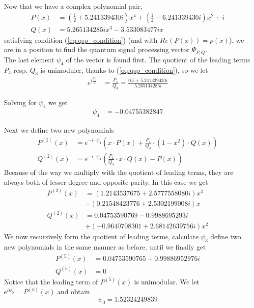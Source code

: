 \documentclass{article}
\begin{document}
\noindent Now that we have a complex polynomial pair, 
\begin{align*}
    P(x) & = \left( \frac{1}{2} + 5.241339430 i \right) x^4 + \left( \frac{1}{2} - 6.241339430 i \right) x^2 + i \\
    Q(x) & = 5.265134285 i x^3 - 3.533083477 i x
\end{align*}
satisfying condition (\ref{eq:qsp_condition}) (and with $Re(P(x)) = p(x)$), we are in a position to find the quantum signal processing vector $\Psi_{P,Q}$. \\

\noindent The last element $\psi_4$ of the vector is found first. The quotient of the leading terms $P_4$ resp. $Q_3$ is unimoduler, thanks to (\ref{eq:qsp_condition}), so we let
\begin{align*}
    e^{i\frac{\psi_4}{2}} & = \frac{P_4}{Q_3} = \frac{0.5 + 5.241339430 i}{5.265134285 i}
\end{align*}

\noindent Solving for $\psi_4$ we get
\begin{align*}
    \psi_4 &= -0.04755382847
\end{align*}

\noindent Next we define two new polynomials 
\begin{align*}
    P^{(2)}(x) &= e^{-i \cdot \psi_4} (x \cdot P(x) + \frac{P_4}{Q_3} \cdot (1 - x^2) \cdot Q(x)) \\
    Q^{(2)}(x) &= e^{-i \cdot \psi_4} (\frac{P_4}{Q_3} \cdot x \cdot Q(x) - P(x))
\end{align*}
\noindent Because of the way we multiply with the quotient of leading terms, they are always both of lesser degree and opposite parity. In this case we get
\begin{align*}
    P^{(2)}(x) &= (1.2143537675 + 2.5777558080 i) x^3 \\
    &- (0.21548423776 + 2.5302199008 i) x  \\
    Q^{(2)}(x) &= 0.04753590769 - 0.9988695293 i \\
    &+ (-0.9640708301 + 2.68142639756 i) x^2 
\end{align*}
We now recursively form the quotient of leading terms, calculate $\psi_3$ define two new polynomials in the same manner as before, until we finally get
\begin{align*}
    P^{(5)}(x) &= 0.04753590765 + 0.99886952976 i \\
    Q^{(5)}(x) &= 0
\end{align*}
Notice that the leading term of $P^{(5)}(x)$ is unimodular. We let $e^{i\psi_0} = P^{(5)}(x)$ and obtain
$$
\psi_0 = 1.52324249839
$$
\end{document}
